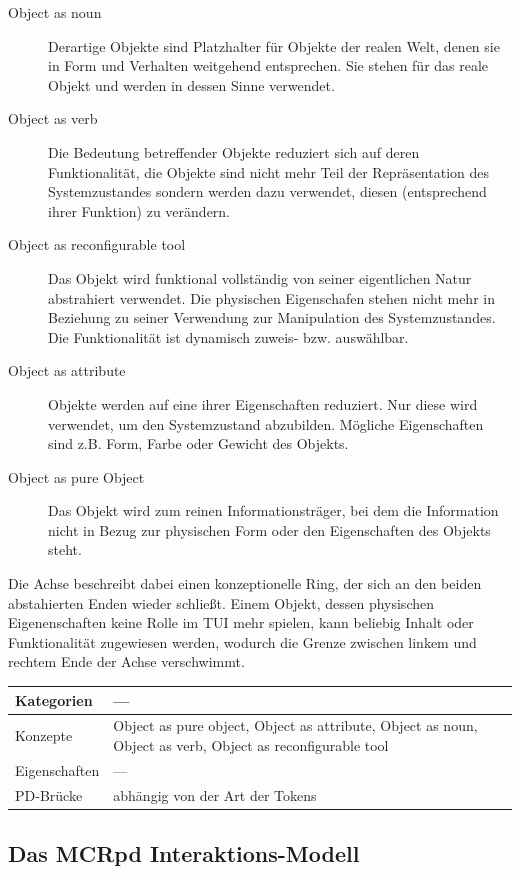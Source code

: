 \begin{description}
	\item[Object as noun] Derartige Objekte sind Platzhalter für Objekte der realen Welt, denen sie in Form und Verhalten weitgehend entsprechen. Sie stehen für das reale Objekt und werden in dessen Sinne verwendet.
	\item[Object as verb] Die Bedeutung betreffender Objekte reduziert sich auf deren Funktionalität, die Objekte sind nicht mehr Teil der Repräsentation des Systemzustandes sondern werden dazu verwendet, diesen (entsprechend ihrer Funktion) zu verändern.
	\item[Object as reconfigurable tool] Das Objekt wird funktional vollständig von seiner eigentlichen Natur abstrahiert verwendet. Die physischen Eigenschafen stehen nicht mehr in Beziehung zu seiner Verwendung zur Manipulation des Systemzustandes. Die Funktionalität ist dynamisch zuweis- bzw. auswählbar.
	\item[Object as attribute] Objekte werden auf eine ihrer Eigenschaften reduziert. Nur diese wird verwendet, um den Systemzustand abzubilden. Mögliche Eigenschaften sind z.B. Form, Farbe oder Gewicht des Objekts.
	\item[Object as pure Object] Das Objekt wird zum reinen Informationsträger, bei dem die Information nicht in Bezug zur physischen Form oder den Eigenschaften des Objekts steht.
\end{description}

Die Achse beschreibt dabei einen konzeptionelle Ring, der sich an den beiden abstahierten Enden wieder schließt. Einem Objekt, dessen physischen Eigenenschaften keine Rolle im \gls{TUI} mehr spielen, kann beliebig Inhalt oder Funktionalität zugewiesen werden, wodurch die Grenze zwischen linkem und rechtem Ende der Achse verschwimmt.

\begin{tabular}{| p{3cm} | p{10cm} |}
  \hline
  Kategorien & --- \\ \hline
  Konzepte & Object as pure object, Object as attribute, Object as noun, Object as verb, Object as reconfigurable tool  \\ \hline
  Eigenschaften & --- \\ \hline
  PD-Brücke & abhängig von der Art der Tokens  \\ \hline
\end{tabular} 

\subsection{Das MCRpd Interaktions-Modell} %
\label{sub:mcrpd}

